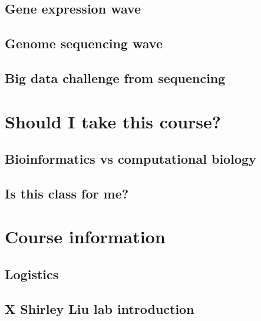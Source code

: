 \documentclass[
]{book}
\begin{document}
\hypertarget{gene-expression-wave}{%
\subsection{Gene expression wave}\label{gene-expression-wave}}

\hypertarget{genome-sequencing-wave}{%
\subsection{Genome sequencing wave}\label{genome-sequencing-wave}}

\hypertarget{big-data-challenge-from-sequencing}{%
\subsection{Big data challenge from sequencing}\label{big-data-challenge-from-sequencing}}

\hypertarget{should-i-take-this-course}{%
\section{Should I take this course?}\label{should-i-take-this-course}}

\hypertarget{bioinformatics-vs-computational-biology}{%
\subsection{Bioinformatics vs computational biology}\label{bioinformatics-vs-computational-biology}}

\hypertarget{is-this-class-for-me}{%
\subsection{Is this class for me?}\label{is-this-class-for-me}}

\hypertarget{course-information-1}{%
\section{Course information}\label{course-information-1}}

\hypertarget{logistics}{%
\subsection{Logistics}\label{logistics}}

\hypertarget{x-shirley-liu-lab-introduction}{%
\subsection{X Shirley Liu lab introduction}\label{x-shirley-liu-lab-introduction}}
\end{document}
